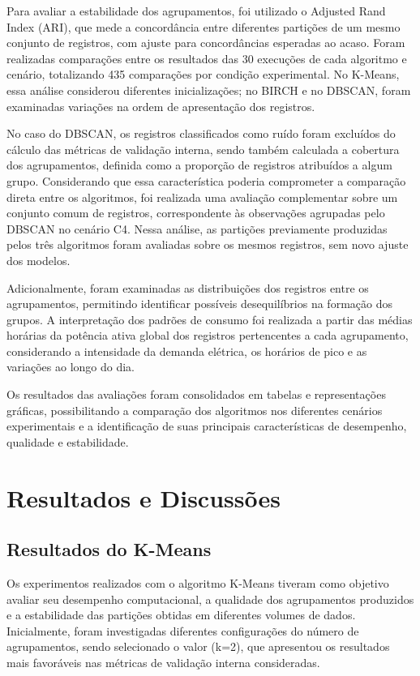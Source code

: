 \documentclass[lettersize,journal]{IEEEtran}
\begin{document}
Para avaliar a estabilidade dos agrupamentos, foi utilizado o Adjusted Rand Index (ARI), que mede a concordância entre diferentes partições de um mesmo conjunto de registros, com ajuste para concordâncias esperadas ao acaso. Foram realizadas comparações entre os resultados das 30 execuções de cada algoritmo e cenário, totalizando 435 comparações por condição experimental. No K-Means, essa análise considerou diferentes inicializações; no BIRCH e no DBSCAN, foram examinadas variações na ordem de apresentação dos registros.

No caso do DBSCAN, os registros classificados como ruído foram excluídos do cálculo das métricas de validação interna, sendo também calculada a cobertura dos agrupamentos, definida como a proporção de registros atribuídos a algum grupo. Considerando que essa característica poderia comprometer a comparação direta entre os algoritmos, foi realizada uma avaliação complementar sobre um conjunto comum de registros, correspondente às observações agrupadas pelo DBSCAN no cenário C4. Nessa análise, as partições previamente produzidas pelos três algoritmos foram avaliadas sobre os mesmos registros, sem novo ajuste dos modelos.

Adicionalmente, foram examinadas as distribuições dos registros entre os agrupamentos, permitindo identificar possíveis desequilíbrios na formação dos grupos. A interpretação dos padrões de consumo foi realizada a partir das médias horárias da potência ativa global dos registros pertencentes a cada agrupamento, considerando a intensidade da demanda elétrica, os horários de pico e as variações ao longo do dia.

Os resultados das avaliações foram consolidados em tabelas e representações gráficas, possibilitando a comparação dos algoritmos nos diferentes cenários experimentais e a identificação de suas principais características de desempenho, qualidade e estabilidade.


\section{Resultados e Discussões}
\label{sec:resultados}


\subsection{Resultados do K-Means}
Os experimentos realizados com o algoritmo K-Means tiveram como objetivo avaliar seu desempenho computacional, a qualidade dos agrupamentos produzidos e a estabilidade das partições obtidas em diferentes volumes de dados. Inicialmente, foram investigadas diferentes configurações do número de agrupamentos, sendo selecionado o valor (k=2), que apresentou os resultados mais favoráveis nas métricas de validação interna consideradas.
\end{document}
